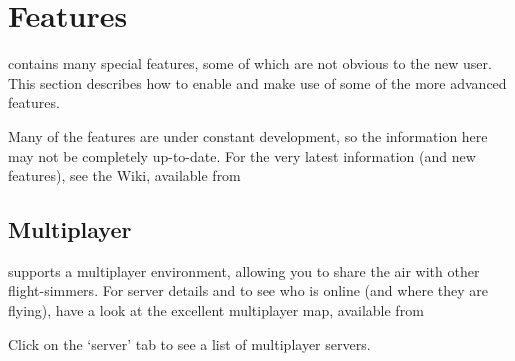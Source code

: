 
\chapter{Features}
\label{features}

\FlightGear{} contains many special features, some of which are not obvious to the new user. This section
describes how to enable and make use of some of the more advanced features.

Many of the features are under constant development, so the information here may not be completely up-to-date.
For the very latest information (and new features), see the \FlightGear{} Wiki, available from

\section{Multiplayer}\label{multiplayer}

\FlightGear{} supports a multiplayer environment, allowing you to share the air with other flight-simmers.
For server details and to see who is online (and where they are flying), have a look at the excellent
multiplayer map, available from

\noindent
{}

Click on the `server' tab to see a list of multiplayer servers.

